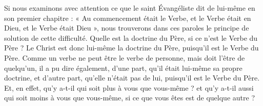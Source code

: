 Si nous examinons avec attention ce que le saint Évangéliste dit de lui-même en son premier chapitre : « Au commencement était le Verbe, et le Verbe était en Dieu, et le Verbe était Dieu », nous trouverons dans ces paroles le principe de solution de cette difficulté. Quelle est la doctrine du Père, si ce n’est le Verbe du Père ? Le Christ est donc lui-même la doctrine du Père, puisqu’il est le Verbe du Père. Comme un verbe ne peut être le verbe de personne, mais doit l’être de quelqu’un, il a pu dire également, d’une part, qu’il était lui-même sa propre doctrine, et d’autre part, qu’elle n’était pas de lui, puisqu’il est le Verbe du Père. Et, en effet, qu’y a-t-il qui soit plus à vous que vous-même ? et qu’y a-t-il aussi qui soit moins à vous que vous-même, si ce que vous êtes est de quelque autre ?
